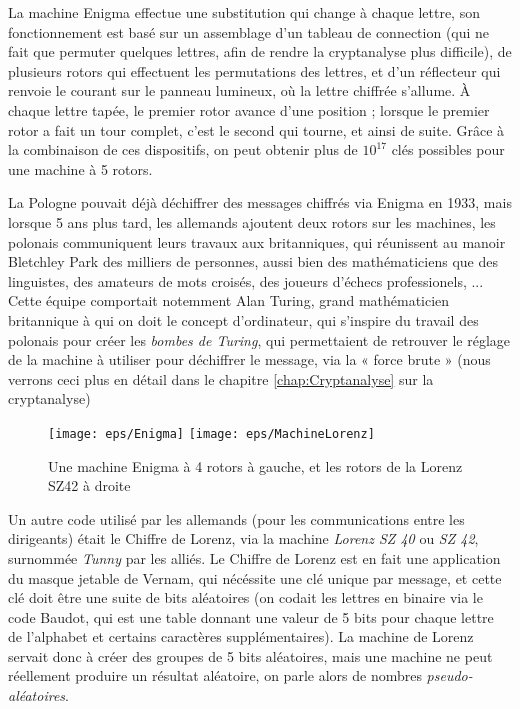 La machine Enigma effectue une substitution qui change à chaque
lettre, son fonctionnement est basé sur un assemblage d'un tableau de
connection (qui ne fait que permuter quelques lettres, afin de rendre
la cryptanalyse plus difficile), de plusieurs rotors qui effectuent
les permutations des lettres, et d'un réflecteur qui renvoie le courant
sur le panneau lumineux, où la lettre chiffrée s'allume. À chaque
lettre tapée, le premier rotor avance d'une position ; lorsque le
premier rotor a fait un tour complet, c'est le second qui tourne, et
ainsi de suite. Grâce à la combinaison de ces dispositifs, on peut
obtenir plus de $10^{17}$ clés possibles pour une machine à 5 rotors.

La Pologne pouvait déjà déchiffrer des messages chiffrés via Enigma en
1933, mais lorsque 5 ans plus tard, les allemands ajoutent deux rotors
sur les machines, les polonais communiquent leurs travaux aux
britanniques, qui réunissent au manoir Bletchley Park des milliers de
personnes, aussi bien des mathématiciens que des linguistes, des
amateurs de mots croisés, des joueurs d'échecs professionels, ...
Cette équipe comportait notemment Alan Turing, grand mathématicien
britannique à qui on doit le concept d'ordinateur, qui s'inspire du
travail des polonais pour créer les \emph{bombes de Turing}, qui
permettaient de retrouver le réglage de la machine à utiliser pour
déchiffrer le message, via la « force brute » (nous verrons ceci plus
en détail dans le chapitre \ref{chap:Cryptanalyse} sur la
cryptanalyse) \\

\begin{figure}[h]
  \begin{center}
    \texttt{[image: eps/Enigma]}
    \hspace{2cm}
    \texttt{[image: eps/MachineLorenz]}
  \end{center}
  \caption{Une machine Enigma à 4 rotors à gauche, et les rotors de la
    Lorenz SZ42 à droite}
  \label{fig:EnigmaLorenz}
\end{figure}


Un autre code utilisé par les allemands (pour les communications entre
les dirigeants) était le Chiffre de Lorenz, via la machine
\emph{Lorenz SZ 40} ou \emph{SZ 42}, surnommée \emph{Tunny} par les alliés. Le
Chiffre de Lorenz est en fait une application du masque jetable de
Vernam, qui nécéssite une clé unique par message, et cette clé doit
être une suite de bits aléatoires (on codait les lettres en binaire
via le code Baudot, qui est une table donnant une valeur de 5 bits
pour chaque lettre de l'alphabet et certains caractères
supplémentaires). La machine de Lorenz servait donc à créer des
groupes de 5 bits aléatoires, mais une machine ne peut réellement
produire un résultat aléatoire, on parle alors de nombres
\emph{pseudo-aléatoires}.


